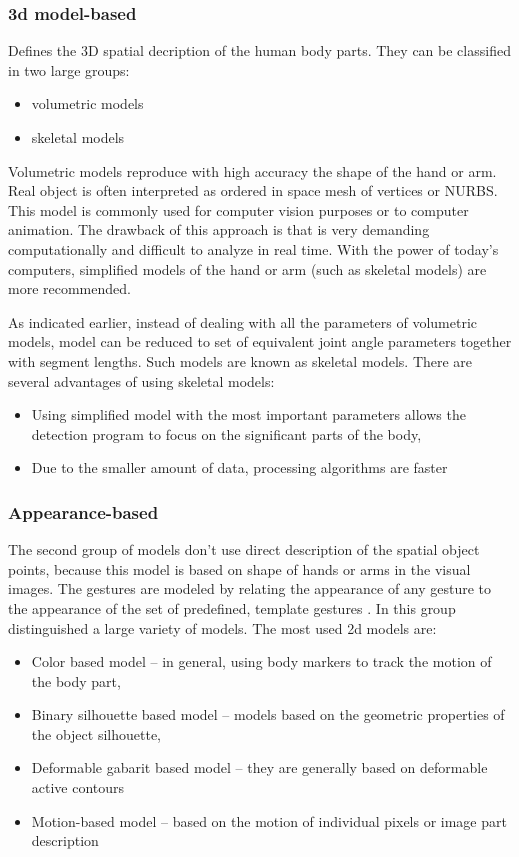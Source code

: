 \subsubsection{3d model-based}

Defines the 3D spatial decription of the human body parts. They can be classified in two large groups:
\begin{itemize}
\item volumetric models
\item skeletal models
\end{itemize}
Volumetric models reproduce with high accuracy the shape of the hand or arm. Real object is often interpreted as ordered in space mesh of vertices or NURBS. This model is commonly used for computer vision purposes or to computer animation. The drawback of this approach is that is very demanding computationally and difficult to analyze in real time. With the power of today’s computers, simplified models of the hand or arm (such as skeletal models) are more recommended.

As indicated earlier, instead of dealing with all the parameters of volumetric models, model can be reduced to set of equivalent joint angle parameters together with segment lengths. Such models are known as skeletal models. There are several advantages of using skeletal models:
\begin{itemize}
\item Using simplified model with the most important parameters allows the detection program to focus on the significant parts of the body,
\item Due to the smaller amount of data, processing algorithms are faster
\end{itemize}

\subsubsection{Appearance-based}

The second group of models don’t use direct description of the spatial object points, because this model is based on shape of hands or arms in the visual images. The gestures are modeled by relating the appearance of any gesture to the appearance of the set of predefined, template gestures \cite{Pavlovic97visualinterpretation}. In this group distinguished a large variety of models. The most used 2d models are:
\begin{itemize}
\item Color based model -- in general, using body markers to track the motion of the body part,
\item Binary silhouette based model -- models based on the geometric properties of the object silhouette,
\item Deformable gabarit based model -- they are generally based on deformable active contours
\item Motion-based model -- based on the motion of individual pixels or image part description
\end{itemize}

